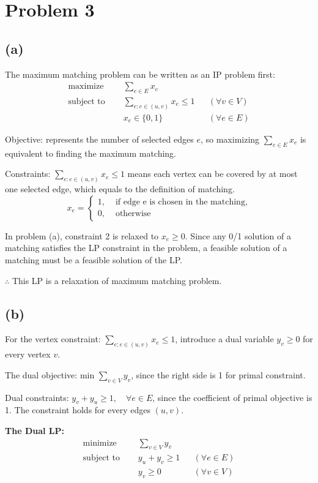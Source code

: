 \documentclass[11pt]{article}
\begin{document}
\section*{Problem 3}
\subsection*{(a)}
The maximum matching problem can be written as an IP problem first:
\begin{align*}
    \text{maximize } \quad 
    & \sum_{e \in E} x_e 
    &&  \\
    \text{subject to } \quad
    & \sum_{e:e \in (u,v)} x_e \le 1
    && (\forall v \in V)\\
    & x_e \in \{0, 1\}
    && (\forall e \in E)
\end{align*}

Objective: represents the number of selected edges $e$, so maximizing $\sum_{e \in E} x_e$ is equivalent to finding the maximum matching.

Constraints: $\sum_{e:e \in (u,v)} x_e \le 1 $ means each vertex can be covered by at most one selected edge, which equals to the definition of matching.
\[x_e = \begin{cases}
    1, & \text{ if edge e is chosen in the matching,} \\
    0, & \text{ otherwise}
\end{cases}\]

In problem (a), constraint 2 is relaxed to $x_e \ge 0$. 
Since any 0/1 solution of a matching satisfies the LP constraint in the problem, 
a feasible solution of a matching must be a feasible solution of the LP.

$\therefore$ This LP is a relaxation of maximum matching problem. 

\subsection*{(b)}
For the vertex constraint: $\sum_{e:e \in (u,v)} x_e \le 1$, introduce a dual variable $y_v \ge 0$ for every vertex $v$. 

The dual objective: $\text{min } \sum_{v \in V} y_v$, since the right side is 1 for primal constraint. 

Dual constraints: $y_v + y_u \ge 1, \quad \forall e \in E$, since the coefficient of primal objective is 1. The constraint holds for every edges $(u, v)$.  

\textbf{The Dual LP:}
\begin{align*}
    \text{minimize } \quad 
    & \sum_{v \in V} y_v 
    &&  \\
    \text{subject to } \quad
    & y_u + y_v \ge 1
    && (\forall e \in E)\\
    & y_v \ge 0 
    && (\forall v \in V)
\end{align*}
\end{document}
